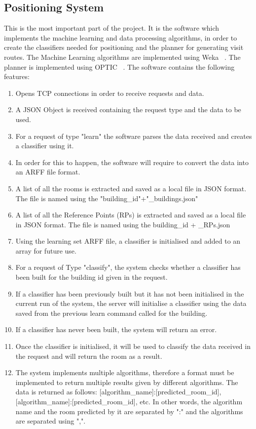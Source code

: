 \subsection{Positioning System}
This is the most important part of the project. It is the software which implements the machine learning and data processing algorithms, in order to create the classifiers needed for positioning and the planner for generating visit routes. The Machine Learning algorithms are implemented using Weka ~\cite{Weka}. The planner is implemented using OPTIC ~\cite{OPTIC}. The software contains the following features:
\begin{enumerate}
\item Opens TCP connections in order to receive requests and data.
\item A JSON Object is received containing the request type and the data to be used.
\item For a request of type "learn" the software parses the data received and creates a classifier using it.
\item In order for this to happen, the software will require to convert the data into an ARFF file format.
\item A list of all the rooms is extracted and saved as a local file in JSON format. The file is named using the "building\_id"+"\_buildings.json"
\item A list of all the Reference Points (RPs) is extracted and saved as a local file in JSON format. The file is named using the building\_id + \_RPs.json
\item Using the learning set ARFF file, a classifier is initialised and added to an array for future use.
\item For a request of Type "classify", the system checks whether a classifier has been built for the building id given in the request.
\item If a classifier has been previously built but it has not been initialised in the current run of the system, the server will initialise a classifier using the data saved from the previous learn command called for the building.
\item If a classifier has never been built, the system will return an error.
\item Once the classifier is initialised, it will be used to classify the data received in the request and will return the room as a result.
\item The system implements multiple algorithms, therefore a format must be implemented to return multiple results given by different algorithms. The data is returned as follows: [algorithm\_name]:[predicted\_room\_id],[algorithm\_name]:[predicted\_room\_id], etc. In other words, the algorithm name and the room predicted by it are separated by ":" and the algorithms are separated using ",".

\end{enumerate}
